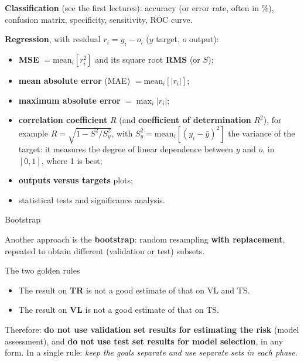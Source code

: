 \textbf{Classification} (see the first lectures): accuracy (or error
rate, often in \%), confusion matrix, specificity, sensitivity, ROC
curve.

\textbf{Regression}, with residual \(r_i = y_i - o_i\) (\(y\) target,
\(o\) output):

\begin{itemize}
\tightlist
\item
  \textbf{MSE} \(= \text{mean}_i[r_i^2]\) and its square root
  \textbf{RMS} (or \(S\));
\item
  \textbf{mean absolute error} (MAE) \(= \text{mean}_i[|r_i|]\);
\item
  \textbf{maximum absolute error} \(= \max_i |r_i|\);
\item
  \textbf{correlation coefficient} \(R\) (and \textbf{coefficient of
  determination} \(R^2\)), for example \(R = \sqrt{1 - S^2/S_y^2}\),
  with \(S_y^2 = \text{mean}_i[(y_i - \bar y)^2]\) the variance of the
  target: it measures the degree of linear dependence between \(y\) and
  \(o\), in \([0,1]\), where 1 is best;
\item
  \textbf{outputs versus targets} plots;
\item
  statistical tests and significance analysis.
\end{itemize}

\begin{boxnote}{Bootstrap}

Another approach is the \textbf{bootstrap}: random resampling
\textbf{with replacement}, repeated to obtain different (validation or
test) subsets.

\end{boxnote}

\begin{boxabstract}{The two golden rules}

\begin{itemize}
\tightlist
\item
  The result on \textbf{TR} is not a good estimate of that on VL and
  TS.
\item
  The result on \textbf{VL} is not a good estimate of that on TS.
\end{itemize}

Therefore: \textbf{do not use validation set results for estimating the
risk} (model assessment), and \textbf{do not use test set results for
model selection}, in any form. In a single rule: \emph{keep the goals
separate and use separate sets in each phase.}

\end{boxabstract}

